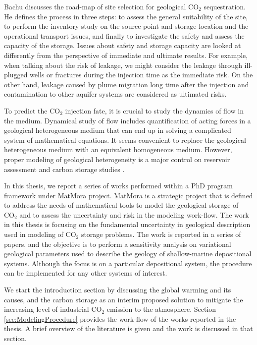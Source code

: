Bachu \cite{bachu2000sequestration} discusses the road-map of site selection for
geological $\mbox{CO}_2$ sequestration. He defines the process in three steps:
to assess the general suitability of the site, to perform the inventory study on
the source point and storage location and the operational transport issues, and
finally to investigate the safety and assess the capacity of the storage. Issues
about safety and storage capacity are looked at differently from the perspective
of immediate and ultimate results. For example, when talking about the risk of
leakage, we might consider the leakage through ill-plugged wells or fractures
during the injection time as the immediate risk. On the other hand, leakage
caused by plume migration long time after the injection and contamination to
other aquifer systems are considered as ultimated risks. 

To predict the $\mbox{CO}_2$ injection fate, it is crucial to study the dynamics
of flow in the medium. Dynamical study of flow includes quantification of
acting forces in a geological heterogeneous medium that can end up in solving a
complicated system of mathematical equations. It seems convenient to replace the
geological heterogeneous medium with an equivalent homogeneous medium. However,
proper modeling of geological heterogeneity is a major control on reservoir
assessment and carbon storage studies
\cite{eaton2006importance,bashore1993importance,melick2009incorporating,
milliken2008effect}.

In this thesis, we report a series of works performed within a PhD program
framework under MatMora project. MatMora is a strategic project that is defined
to address the needs of mathematical tools to model the geological storage of
$\mbox{CO}_2$ and to assess the uncertainty and risk in the modeling work-flow.
The work in this thesis is focusing on the fundamental uncertainty in geological
description used in modeling of $\mbox{CO}_2$ storage problems. The work is
reported in a series of papers, and the objective is to perform a sensitivity
analysis on variational geological parameters used to describe the geology of
shallow-marine depositional systems. Although the focus is on a particular
depositional system, the procedure can be implemented for any other systems of
interest. 

We start the introduction section by discussing the global warming and its
causes, and the carbon storage as an interim proposed solution to mitigate the
increasing level of industrial $\mbox{CO}_2$ emission to the atmosphere. Section
\ref{sec:ModelingProcedure} provides the work-flow of the works reported in the
thesis. A brief overview of the literature is given and the work is discussed in
that section. 

